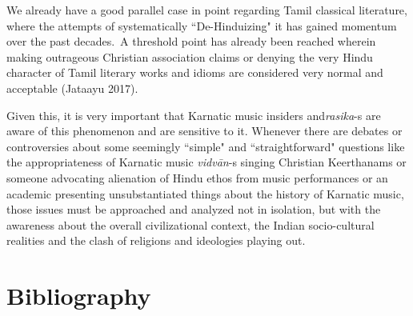We already have a good parallel case in point regarding Tamil classical literature, where the attempts of systematically ``De-Hinduizing" it has gained momentum over the past decades.~A threshold point has already been reached wherein making outrageous Christian association claims or denying the very Hindu character of Tamil literary works and idioms are considered very normal and acceptable (Jataayu 2017).

Given this, it is very important that Karnatic music insiders and\break \textit{rasika}-s are aware of this phenomenon and are sensitive to it. Whenever there are debates or controversies about some seemingly ``simple" and ``straightforward" questions like the appropriateness of Karnatic music \textit{vidvān}-s singing Christian Keerthanams or someone advocating alienation of Hindu ethos from music performances or an academic presenting unsubstantiated things about the history of Karnatic music, those issues must be approached and analyzed not in isolation, but with the awareness about the overall civilizational context, the Indian socio-cultural realities and the clash of religions and ideologies playing out.


\section*{Bibliography}

